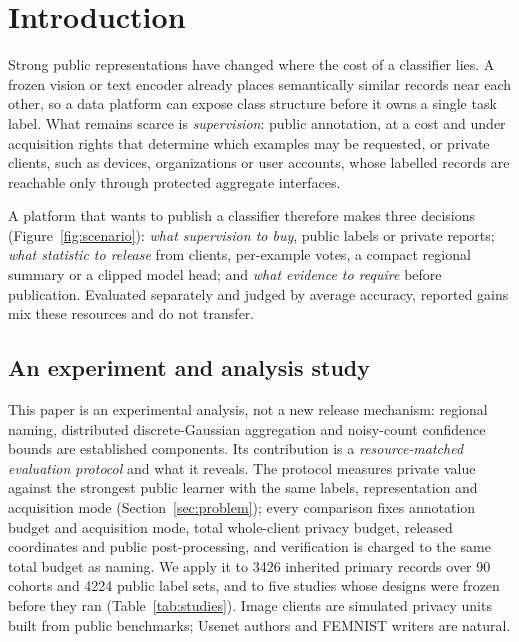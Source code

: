 \section{Introduction}
\label{sec:intro}

Strong public representations have changed where the cost of a classifier
lies. A frozen vision or text encoder already places semantically similar
records near each other, so a data platform can expose class structure
before it owns a single task label. What remains scarce is
\emph{supervision}: public annotation, at a cost and under acquisition rights
that determine which examples may be requested, or private clients, such as
devices, organizations or user accounts, whose labelled records are reachable
only through protected aggregate interfaces.

A platform that wants to publish a classifier therefore makes three decisions
(Figure~\ref{fig:scenario}): \emph{what supervision to buy}, public labels or
private reports; \emph{what statistic to release} from clients, per-example
votes, a compact regional summary or a clipped model head; and \emph{what
evidence to require} before publication. Evaluated separately and judged by average
accuracy, reported gains mix these resources and do not transfer.



\subsection{An experiment and analysis study}

This paper is an experimental analysis, not a new release mechanism:
regional naming, distributed discrete-Gaussian aggregation and noisy-count
confidence bounds are established components. Its contribution is a
\emph{resource-matched evaluation protocol} and what it reveals. The
protocol measures private value against the strongest public learner with the
same labels, representation and acquisition mode (Section~\ref{sec:problem});
every comparison fixes annotation budget and acquisition mode, total
whole-client privacy budget, released coordinates and public post-processing,
and verification is charged to the same total budget as naming. We apply it
to 3426 inherited primary records over 90 cohorts and 4224 public label sets,
and to five studies whose designs were frozen before they ran
(Table~\ref{tab:studies}). Image clients are simulated privacy units built
from public benchmarks; Usenet authors and FEMNIST writers are natural.

